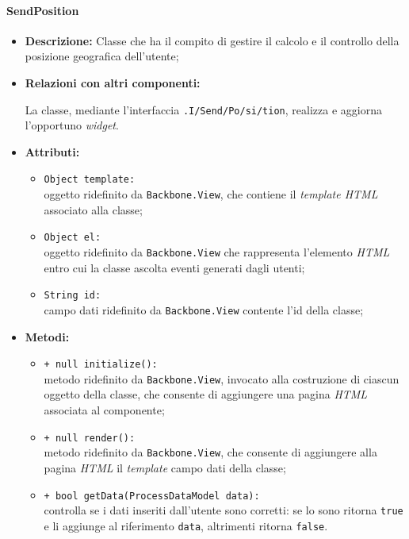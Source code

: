 \paragraph{SendPosition}
\label{sendPosition}
\begin{flushleft}
\begin{itemize}
\item \textbf{Descrizione:} Classe che ha il compito di gestire il calcolo e il controllo della posizione geografica dell'utente;
\item \textbf{Relazioni con altri componenti:}
\begin{sloppypar}
La classe, mediante l'interfaccia \texttt{\viewUser{}.I\fshyp{}Send\fshyp{}Po\fshyp{}si\fshyp{}tion}, realizza e aggiorna l'opportuno \textit{widget}.
\end{sloppypar}
\item \textbf{Attributi:}
\begin{sloppypar}
\begin{itemize}
\item \texttt{Object template:}\\ oggetto ridefinito da \texttt{Backbone.View}, che contiene il \textit{template HTML} associato alla classe;
\item \texttt{Object el:}\\ oggetto ridefinito da \texttt{Backbone.View} che rappresenta l'elemento \textit{HTML} entro cui la classe ascolta eventi generati dagli utenti;
\item \texttt{String id:}\\ campo dati ridefinito da \texttt{Backbone.View} contente l'id della classe;
\end{itemize}
\end{sloppypar}
\item \textbf{Metodi:}
\begin{sloppypar}
\begin{itemize}
\item \texttt{+ null initialize():}\\ metodo ridefinito da \texttt{Backbone.View}, invocato alla costruzione di ciascun oggetto della classe, che consente di aggiungere una pagina \textit{HTML} associata al componente;
\item \texttt{+ null render():}\\ metodo ridefinito da \texttt{Backbone.View}, che consente di aggiungere alla pagina \textit{HTML} il \textit{template} campo dati della classe;
\item \texttt{+ bool getData(ProcessDataModel data):}\\ controlla se i dati inseriti dall'utente sono corretti: se lo sono ritorna \texttt{true} e li aggiunge al riferimento \texttt{data}, altrimenti ritorna \texttt{false}.
\end{itemize}
\end{sloppypar}
\end{itemize}
\end{flushleft}

